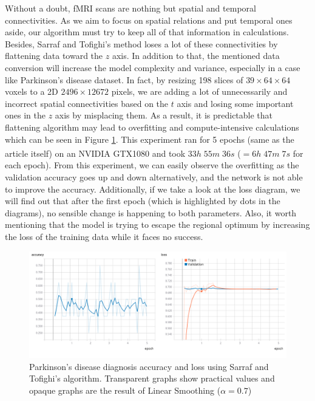 \documentclass[preprint,12pt]{elsarticle}
\begin{document}
Without a doubt, fMRI scans are nothing but spatial and temporal connectivities. As we aim to focus on spatial relations and put temporal ones aside, our algorithm must try to keep all of that information in calculations. Besides, Sarraf and Tofighi's method loses a lot of these connectivities by flattening data toward the $z$ axis. In addition to that, the mentioned data conversion will increase the model complexity and variance, especially in a case like Parkinson's disease dataset. In fact, by resizing 198 slices of $39 \times 64 \times 64$ voxels to a 2D $2496 \times 12672$ pixels, we are adding a lot of unnecessarily and incorrect spatial connectivities based on the $t$ axis and losing some important ones in the $z$ axis by misplacing them. As a result, it is predictable that flattening algorithm may lead to overfitting and compute-intensive calculations which can be seen in Figure \ref{fig:SarrafParkinsonTestResult}. This experiment ran for 5 epochs (same as the article itself) on an NVIDIA\textsuperscript{\tiny\textregistered} GTX1080 and took $33h \; 55m \; 36s$ {\tiny{($=6h \; 47m \; 7s$ for each epoch)}}. From this experiment, we can easily observe the overfitting as the validation accuracy goes up and down alternatively, and the network is not able to improve the accuracy. Additionally, if we take a look at the loss diagram, we will find out that after the first epoch (which is highlighted by dots in the diagrams), no sensible change is happening to both parameters. Also, it worth mentioning that the model is trying to escape the regional optimum by increasing the loss of the training data while it faces no success.


\begin{figure}
	\includegraphics[width=\linewidth]{images/SarrafParkinsonTestResult}
	\caption{Parkinson's disease diagnosis accuracy and loss using Sarraf and Tofighi's algorithm. Transparent graphs show practical values and opaque graphs are the result of Linear Smoothing ($\alpha = 0.7$)}
	\label{fig:SarrafParkinsonTestResult}
\end{figure}
\end{document}
